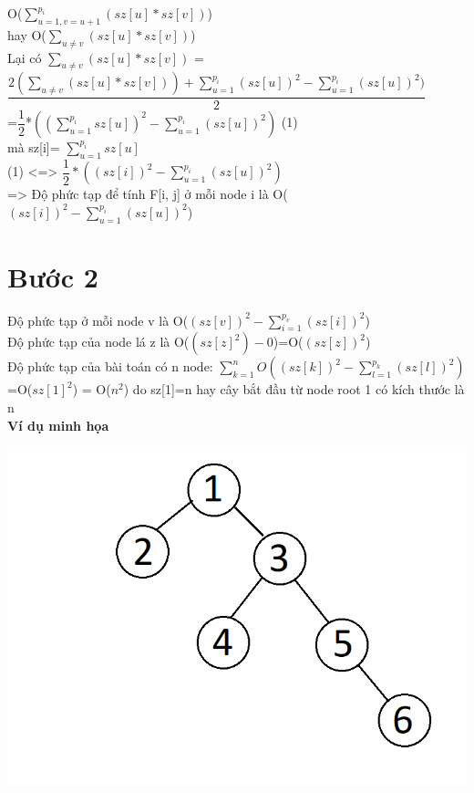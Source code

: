 \documentclass[10pt,a4paper]{article}
\begin{document}
O($\sum_{u=1, v=u+1}^{p_i}(sz[u]*sz[v])$)\\
hay O($\sum_{u \neq v}^{}(sz[u]*sz[v])$)\\
Lại có $\sum_{u \neq v}^{}(sz[u]*sz[v])$ = $\dfrac{2(\sum_{u \neq v}^{}(sz[u]*sz[v]))+\sum_{u=1}^{p_i}(sz[u])^2-\sum_{u=1}^{p_i}(sz[u])^2)}{2}$\\
=$\dfrac{1}{2}$*$((\sum_{u=1}^{p_i}sz[u])^2-\sum_{u=1}^{p_i}(sz[u])^2)$ (1)\\
mà sz[i]= $\sum_{u=1}^{p_i}sz[u]$\\
(1) <=> $\dfrac{1}{2} * ((sz[i])^2-\sum_{u=1}^{p_i}(sz[u])^2)$\\
=> Độ phức tạp để tính F[i, j] ở mỗi node i là O($(sz[i])^2-\sum_{u=1}^{p_i}(sz[u])^2$)\\

\fontsize{14}{25}\selectfont
\section[\textbf]{Bước 2}
Độ phức tạp ở mỗi node v là O($(sz[v])^2-\sum_{i=1}^{p_v}(sz[i])^2$)\\
Độ phức tạp của node lá z là O($(sz[z]^2)-0$)=O($(sz[z])^2$)\\
Độ phức tạp của bài toán có n node: $\sum_{k=1}^{n}O((sz[k])^2-\sum_{l=1}^{p_k}(sz[l])^2)$\\
=O($sz[1]^2$) = O($n^2$) do sz[1]=n hay cây bắt đầu từ node root 1 có kích thước là n\\
\bfseries 
Ví dụ minh họa
\mdseries
\begin{center}
     \includegraphics[scale=.5]{vidu.png} \\
\end{center}
\end{document}
